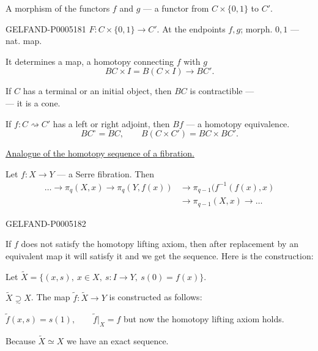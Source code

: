 A morphism of the functors $f$ and $g$ — a functor from $C\times\{0,1\}$ to $C'$.


\begin{GelfandAdjacentEvidence}{GELFAND-P000518}{1}
$F:C\times\{0,1\}\to C'$. At the endpoints $f,g$; morph. $0,1$ — nat. map.

It determines a map, a homotopy connecting $f$ with $g$
\[
BC\times I=B(C\times I)\to BC'.
\]

If $C$ has a terminal or an initial object, then $BC$ is contractible —\\
— it is a cone.

If $f:C\rightsquigarrow C'$ has a left or right adjoint, then $Bf$ — a homotopy equivalence.
\[
BC^{\circ}=BC,\qquad B(C\times C')=BC\times BC'.
\]

\uline{Analogue of the homotopy sequence of a fibration.}

Let $f:X\to Y$ — a Serre fibration. Then
\[
\begin{aligned}
\ldots\to\pi_q(X,x)\to\pi_q(Y,f(x))
&\to\pi_{q-1}(f^{-1}(f(x),x)\\
&\to\pi_{q-1}(X,x)\to\ldots
\end{aligned}
\]
\end{GelfandAdjacentEvidence}
\begin{GelfandAdjacentEvidence}{GELFAND-P000518}{2}


If $f$ does not satisfy the homotopy lifting axiom, then after replacement by an equivalent map it will satisfy it and we get the sequence. Here is the construction:

Let $\widetilde X=\{(x,s),\ x\in X,\ s:I\to Y,\ s(0)=f(x)\}$.

$\widetilde X\underset{\sim}{\supset}X$. The map $\widetilde f:\widetilde X\to Y$ is constructed as follows:

$\widetilde f(x,s)=s(1),\qquad\widetilde f|_X=f$ but now the homotopy lifting axiom holds.

Because $\widetilde X\simeq X$ we have an exact sequence.
\end{GelfandAdjacentEvidence}
